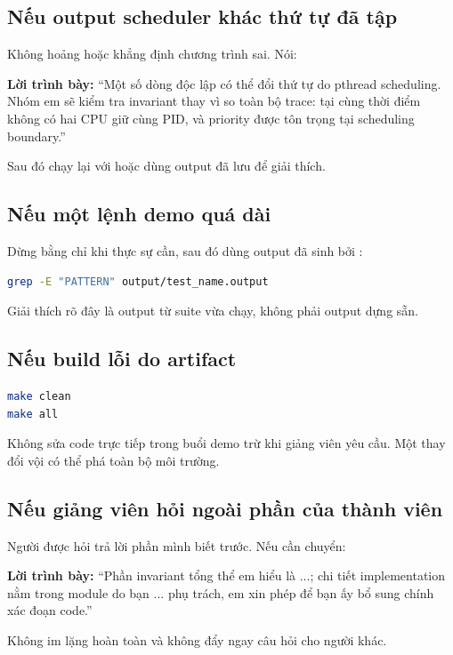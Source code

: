 \documentclass[12pt,a4paper]{article}
\newcommand{\code}[1]{\texttt{\detokenize{#1}}}
\newcommand{\say}[1]{\textbf{\color{bkblue}Lời trình bày:} ``#1''}
\begin{document}
\subsection{Nếu output scheduler khác thứ tự đã tập}

Không hoảng hoặc khẳng định chương trình sai. Nói:

\say{Một số dòng độc lập có thể đổi thứ tự do pthread scheduling. Nhóm em sẽ
kiểm tra invariant thay vì so toàn bộ trace: tại cùng thời điểm không có hai
CPU giữ cùng PID, và priority được tôn trọng tại scheduling boundary.}

Sau đó chạy lại với \code{grep} hoặc dùng output đã lưu để giải thích.

\subsection{Nếu một lệnh demo quá dài}

Dừng bằng \code{Ctrl-C} chỉ khi thực sự cần, sau đó dùng output đã sinh bởi
\code{make test}:

\begin{lstlisting}[language=bash]
grep -E "PATTERN" output/test_name.output
\end{lstlisting}

Giải thích rõ đây là output từ suite vừa chạy, không phải output dựng sẵn.

\subsection{Nếu build lỗi do artifact}

\begin{lstlisting}[language=bash]
make clean
make all
\end{lstlisting}

Không sửa code trực tiếp trong buổi demo trừ khi giảng viên yêu cầu. Một thay
đổi vội có thể phá toàn bộ môi trường.

\subsection{Nếu giảng viên hỏi ngoài phần của thành viên}

Người được hỏi trả lời phần mình biết trước. Nếu cần chuyển:

\say{Phần invariant tổng thể em hiểu là ...; chi tiết implementation nằm trong
module do bạn ... phụ trách, em xin phép để bạn ấy bổ sung chính xác đoạn code.}

Không im lặng hoàn toàn và không đẩy ngay câu hỏi cho người khác.
\end{document}
